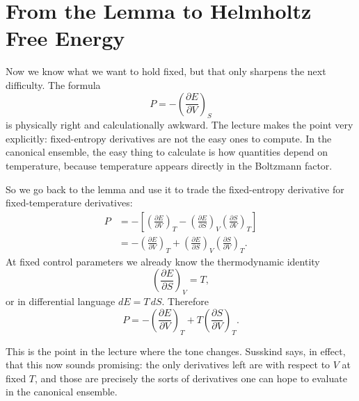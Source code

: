 \section{From the Lemma to Helmholtz Free Energy}

Now we know what we want to hold fixed, but that only sharpens the next difficulty. The formula
\begin{equation}
P=-\left(\frac{\partial E}{\partial V}\right)_S
\end{equation}
is physically right and calculationally awkward. The lecture makes the point very explicitly: fixed-entropy derivatives are not the easy ones to compute. In the canonical ensemble, the easy thing to calculate is how quantities depend on temperature, because temperature appears directly in the Boltzmann factor.

So we go back to the lemma and use it to trade the fixed-entropy derivative for fixed-temperature derivatives:
\begin{align}
P
&=
-
\left[
\left(\frac{\partial E}{\partial V}\right)_T
-
\left(\frac{\partial E}{\partial S}\right)_V
\left(\frac{\partial S}{\partial V}\right)_T
\right] \\
&=
-
\left(\frac{\partial E}{\partial V}\right)_T
+
\left(\frac{\partial E}{\partial S}\right)_V
\left(\frac{\partial S}{\partial V}\right)_T.
\end{align}
At fixed control parameters we already know the thermodynamic identity
\begin{equation}
\left(\frac{\partial E}{\partial S}\right)_V=T,
\end{equation}
or in differential language \(dE=T\,dS\). Therefore
\begin{equation}
P
=
-
\left(\frac{\partial E}{\partial V}\right)_T
+
T\left(\frac{\partial S}{\partial V}\right)_T.
\end{equation}

This is the point in the lecture where the tone changes. Susskind says, in effect, that this now sounds promising: the only derivatives left are with respect to \(V\) at fixed \(T\), and those are precisely the sorts of derivatives one can hope to evaluate in the canonical ensemble.

